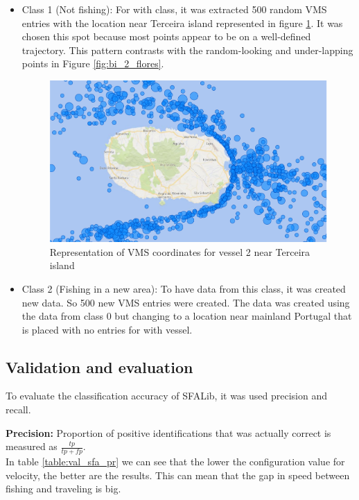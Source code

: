 \begin{itemize}
\item Class 1 (Not fishing): For with class, it was extracted 500 random VMS entries with the location near Terceira island represented in figure \ref{fig:bi_2_travel}. It was chosen this spot because most points appear to be on a well-defined trajectory. This pattern contrasts with the random-looking and under-lapping points in Figure \ref{fig:bi_2_flores}. 

\begin{figure}[H]
\centering
\includegraphics[width=0.8\linewidth]{Chapters/img/2viagem.pdf}
\caption{Representation of VMS coordinates for vessel 2 near Terceira island}
\label{fig:bi_2_travel}
\end{figure}



\item Class 2 (Fishing in a new area): To have data from this class, it was created new data. So 500 new VMS entries were created. The data was created using the data from class 0 but changing to a location near mainland Portugal that is placed with no entries for with vessel. 

\end{itemize}




\subsection{Validation and evaluation}
\label{sec:val_SFA_val_eva}

To evaluate the classification accuracy of SFALib, it was used precision and recall.

\textbf{Precision:} Proportion of positive identifications that was actually correct is measured as \(\frac{tp}{tp+fp} \).\\
In table \ref{table:val_sfa_pr} we can see that the lower the configuration value for velocity, the better are the results.
This can mean that the gap in speed between fishing and traveling is big.

